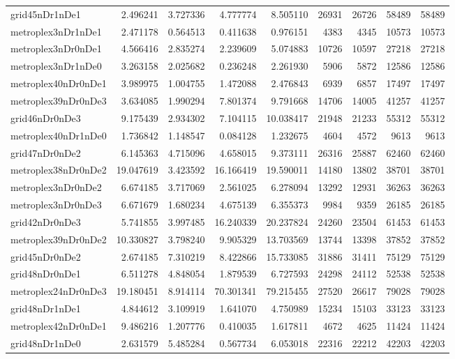 \begin{longtable}{|l|r|r|r|r|r|r|r|r|}
grid45nDr1nDe1 & 2.496241 & 3.727336 & 4.777774 & 8.505110 & 26931 & 26726 & 58489 & 58489 \\
metroplex3nDr1nDe1 & 2.471178 & 0.564513 & 0.411638 & 0.976151 & 4383 & 4345 & 10573 & 10573 \\
metroplex3nDr0nDe1 & 4.566416 & 2.835274 & 2.239609 & 5.074883 & 10726 & 10597 & 27218 & 27218 \\
metroplex3nDr1nDe0 & 3.263158 & 2.025682 & 0.236248 & 2.261930 & 5906 & 5872 & 12586 & 12586 \\
metroplex40nDr0nDe1 & 3.989975 & 1.004755 & 1.472088 & 2.476843 & 6939 & 6857 & 17497 & 17497 \\
metroplex39nDr0nDe3 & 3.634085 & 1.990294 & 7.801374 & 9.791668 & 14706 & 14005 & 41257 & 41257 \\
grid46nDr0nDe3 & 9.175439 & 2.934302 & 7.104115 & 10.038417 & 21948 & 21233 & 55312 & 55312 \\
metroplex40nDr1nDe0 & 1.736842 & 1.148547 & 0.084128 & 1.232675 & 4604 & 4572 & 9613 & 9613 \\
grid47nDr0nDe2 & 6.145363 & 4.715096 & 4.658015 & 9.373111 & 26316 & 25887 & 62460 & 62460 \\
metroplex38nDr0nDe2 & 19.047619 & 3.423592 & 16.166419 & 19.590011 & 14180 & 13802 & 38701 & 38701 \\
metroplex3nDr0nDe2 & 6.674185 & 3.717069 & 2.561025 & 6.278094 & 13292 & 12931 & 36263 & 36263 \\
metroplex3nDr0nDe3 & 6.671679 & 1.680234 & 4.675139 & 6.355373 & 9984 & 9359 & 26185 & 26185 \\
grid42nDr0nDe3 & 5.741855 & 3.997485 & 16.240339 & 20.237824 & 24260 & 23504 & 61453 & 61453 \\
metroplex39nDr0nDe2 & 10.330827 & 3.798240 & 9.905329 & 13.703569 & 13744 & 13398 & 37852 & 37852 \\
grid45nDr0nDe2 & 2.674185 & 7.310219 & 8.422866 & 15.733085 & 31886 & 31411 & 75129 & 75129 \\
grid48nDr0nDe1 & 6.511278 & 4.848054 & 1.879539 & 6.727593 & 24298 & 24112 & 52538 & 52538 \\
metroplex24nDr0nDe3 & 19.180451 & 8.914114 & 70.301341 & 79.215455 & 27520 & 26617 & 79028 & 79028 \\
grid48nDr1nDe1 & 4.844612 & 3.109919 & 1.641070 & 4.750989 & 15234 & 15103 & 33123 & 33123 \\
metroplex42nDr0nDe1 & 9.486216 & 1.207776 & 0.410035 & 1.617811 & 4672 & 4625 & 11424 & 11424 \\
grid48nDr1nDe0 & 2.631579 & 5.485284 & 0.567734 & 6.053018 & 22316 & 22212 & 42203 & 42203 \\

\end{longtable}
